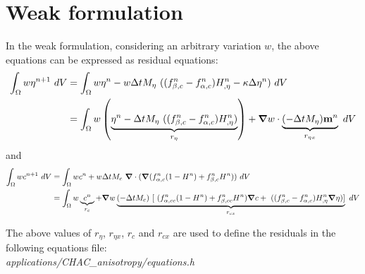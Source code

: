 \documentclass[10pt]{article}
\newcommand{\gv}[1]{\ensuremath{\mbox{\boldmath$ #1 $}}}
\newcommand{\grad}[1]{\gv{\nabla} #1}
\begin{document}
\section{Weak formulation}
In the weak formulation, considering an arbitrary variation $w$, the above equations can be expressed as residual equations:
\begin{align}
  \int_{\Omega}   w  \eta^{n+1}  ~dV &= \int_{\Omega}   w \eta^{n} -   w    \Delta t M_{\eta}~ ((f_{\beta,c}^n-f_{\alpha,c}^n)H_{,\eta}^n - \kappa \Delta \eta^n)  ~dV\\
  &=\int_{\Omega}  w  \left( \underbrace{\eta^{n} - \Delta t M_{\eta}~ ((f_{\beta,c}^n-f_{\alpha,c}^n)H_{,\eta}^n)}_{r_{\eta}} \right)+ \grad w \cdot \underbrace{(- \Delta t M_{\eta})   \mathbf{m}^n}_{r_{\eta x}} ~dV 
\end{align}
and 
\begin{align}
  \int_{\Omega}   w  c^{n+1}  ~dV &= \int_{\Omega}   w c^{n} + w    \Delta t M_{c}~ \grad \cdot (\grad (f_{\alpha,c}^n(1-H^{n})+f_{\beta,c}^n H^{n}))  ~dV\\
    &= \int_{\Omega}   w \underbrace{c^{n}}_{r_c} +  \grad w   \underbrace{(-\Delta t M_{c})~ [~(f_{\alpha,cc}^n(1-H^{n})+f_{\beta,cc}^n H^{n}) \grad c + ~((f_{\beta,c}^n-f_{\alpha,c}^n)H^{n}_{,\eta} \grad \eta) ] }_{r_{cx}} ~dV
\end{align}

\vskip 0.25in
The above values of $r_{\eta}$, $r_{\eta x}$, $r_{c}$ and $r_{cx}$ are used to define the residuals in the following equations file: \\
\textit{applications/CHAC\_anisotropy/equations.h}
\end{document}

